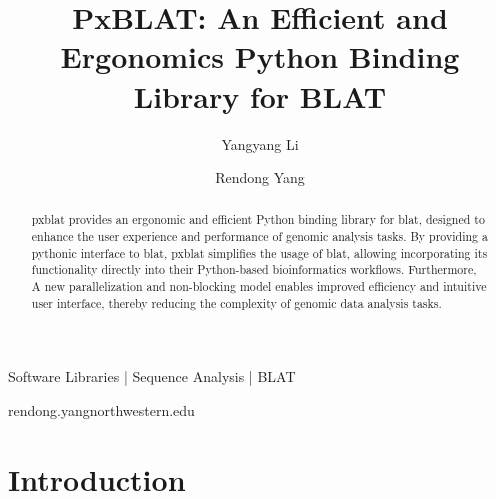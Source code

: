 
\title{PxBLAT: An Efficient and Ergonomics Python Binding Library for BLAT}

\author[1]{Yangyang Li}
\author[1,\Letter]{Rendong Yang }
\date{}

\maketitle

\begin{abstract}
	\gls{pxblat} provides an ergonomic and efficient Python binding library for \gls{blat}, designed to enhance the user experience and performance of genomic analysis tasks.
	By providing a pythonic interface to \gls{blat}, \gls{pxblat} simplifies the usage of \gls{blat}, allowing incorporating its functionality directly into their Python-based bioinformatics workflows.
	Furthermore, A new parallelization and non-blocking model enables improved efficiency and intuitive user interface, thereby reducing the complexity of genomic data analysis tasks.
\end{abstract}


\begin{keywords}
	Software Libraries |  Sequence Analysis | BLAT
\end{keywords}

\begin{corrauthor}
	rendong.yang\at northwestern.edu
\end{corrauthor}

\section*{Introduction}\label{sec:introduction}




